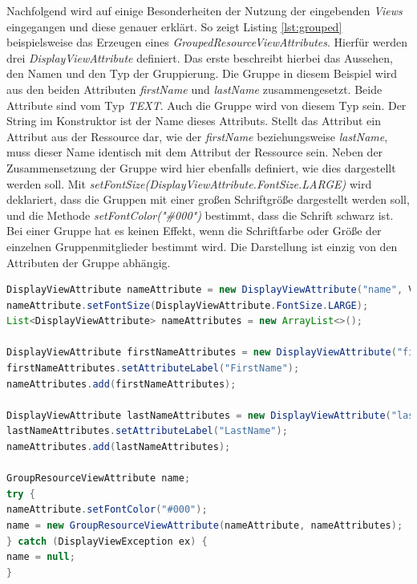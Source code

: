 Nachfolgend wird auf einige Besonderheiten der Nutzung der eingebenden \textit{Views} eingegangen und diese genauer erklärt. So zeigt Listing \ref{lst:grouped} beispielsweise das Erzeugen eines \textit{GroupedResourceViewAttributes}. Hierfür werden drei \textit{DisplayViewAttribute} definiert. Das erste beschreibt hierbei das Aussehen, den Namen und den Typ der Gruppierung. Die Gruppe in diesem Beispiel wird aus den beiden Attributen \textit{firstName} und \textit{lastName} zusammengesetzt. Beide Attribute sind vom Typ \textit{TEXT}. Auch die Gruppe wird von diesem Typ sein. Der String im Konstruktor ist der Name dieses Attributs. Stellt das Attribut ein Attribut aus der Ressource dar, wie der \textit{firstName} beziehungsweise \textit{lastName}, muss dieser Name identisch mit dem Attribut der Ressource sein. Neben der Zusammensetzung der Gruppe wird hier ebenfalls definiert, wie dies dargestellt werden soll. Mit \textit{setFontSize(DisplayViewAttribute.FontSize.LARGE)} wird deklariert, dass die Gruppen mit einer großen Schriftgröße dargestellt werden soll, und die Methode \textit{setFontColor("\#000")} bestimmt, dass die Schrift schwarz ist. Bei einer Gruppe hat es keinen Effekt, wenn die Schriftfarbe oder Größe der einzelnen Gruppenmitglieder bestimmt wird. Die Darstellung ist einzig von den Attributen der Gruppe abhängig.

\newpage

\begin{lstlisting}[label=lst:grouped,
language=java,
firstnumber=1,
caption=Erstellung eines \textit{GroupedResourceViewAttributes}.]		
DisplayViewAttribute nameAttribute = new DisplayViewAttribute("name", ViewAttribute.AttributeType.TEXT);
nameAttribute.setFontSize(DisplayViewAttribute.FontSize.LARGE);
List<DisplayViewAttribute> nameAttributes = new ArrayList<>();

DisplayViewAttribute firstNameAttributes = new DisplayViewAttribute("firstName", ViewAttribute.AttributeType.TEXT);
firstNameAttributes.setAttributeLabel("FirstName");
nameAttributes.add(firstNameAttributes);

DisplayViewAttribute lastNameAttributes = new DisplayViewAttribute("lastName", ViewAttribute.AttributeType.TEXT);
lastNameAttributes.setAttributeLabel("LastName");
nameAttributes.add(lastNameAttributes);

GroupResourceViewAttribute name;
try {
nameAttribute.setFontColor("#000");
name = new GroupResourceViewAttribute(nameAttribute, nameAttributes);
} catch (DisplayViewException ex) {
name = null;
}
\end{lstlisting}

